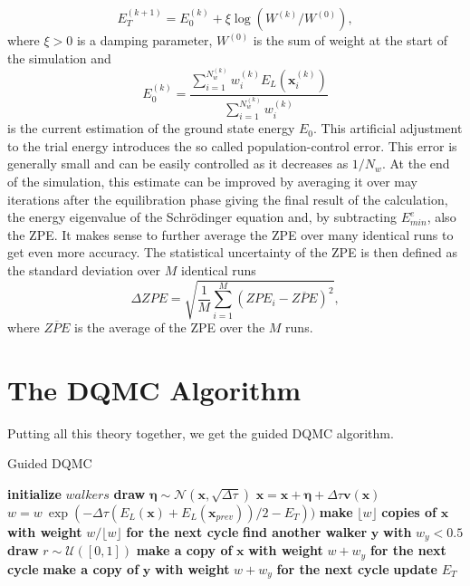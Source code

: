 \documentclass [12pt]{report}
\begin{document}
\begin{equation}\label{eq:2.12} 
E_T^{(k+1)} = E_0^{(k)} + \xi \log(W^{(k)}/W^{(0)}),
\end{equation}
where $\xi > 0$ is a damping parameter, $W^{(0)}$ is the sum of weight at the start of the simulation and
\begin{equation}\label{eq:2.13} 
E_0^{(k)} = \frac{\sum_{i = 1}^{N_w^{(k)}} w_{i}^{(k)} E_L(\bm{x}_{i}^{(k)})}{\sum_{i = 1}^{N_w^{(k)}} w_{i}^{(k)} }
\end{equation}
is the current estimation of the ground state energy $E_0$. This artificial adjustment to the trial energy introduces the so called population-control error. This error is generally small and can be easily controlled as it decreases as $1/N_{w}$. At the end of the simulation, this estimate can be improved by averaging it over may iterations after the equilibration phase giving the final result of the calculation, the energy eigenvalue of the Schrödinger equation and, by subtracting $E^e_{min}$, also the ZPE. It makes sense to further average the ZPE over many identical runs to get even more accuracy. The statistical uncertainty of the ZPE is then defined as the standard deviation over $M$ identical runs \cite{herleitung2}
\begin{equation}
\Delta ZPE = \sqrt{\frac{1}{M} \sum_{i=1}^M(ZPE_i - \overline{ZPE})^2},
\end{equation}
where $\overline{ZPE}$ is the average of the ZPE over the $M$ runs.
\newpage
\section{The DQMC Algorithm}
Putting all this theory together, we get the guided DQMC algorithm.
\begin{algorithm}
\caption{Guided DQMC}\label{dqmc}
\begin{algorithmic}[1]
\State \textbf{initialize} $walkers$
		\State \textbf{draw} $\bm{\eta} \sim \mathcal{N}(\bm{x},\sqrt{\Delta \tau})$
		\State $\bm{x} = \bm{x} + \bm{\eta} + \Delta \tau \bm{v}(\bm{x})$ 
		\State $w = w \: \exp{(-\Delta \tau (E_L(\bm{x})+E_L(\bm{x}_{prev}))/2 - E_T))}$
		\State \textbf{make} $\lfloor w \rfloor$ \textbf{copies of} $\bm{x}$ \textbf{with weight} $w/\lfloor w \rfloor$ \textbf{for the next cycle}
		\EndIf
		\State \textbf{find another walker} $\bm{y}$ \textbf{with} $w_y < 0.5$
		\State \textbf{draw} $r \sim \mathcal{U}([0,1])$
		\State \textbf{make a copy of} $\bm{x}$ \textbf{with weight} $w+w_y$ \textbf{for the next cycle}
		\Else
		\State \textbf{make a copy of} $\bm{y}$ \textbf{with weight} $w+w_y$ \textbf{for the next cycle}
		\EndIf
		\EndIf 
	\EndFor
	\State \textbf{update} $E_T$ 
\EndFor 
\EndProcedure
\end{algorithmic}
\end{algorithm}
\newpage
\end{document}
